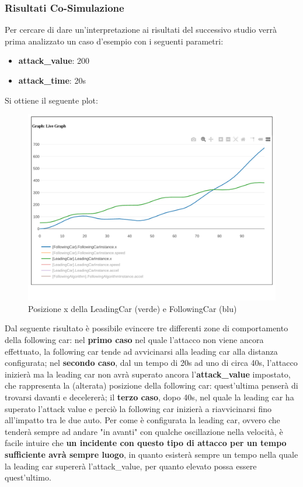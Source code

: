 \subsubsection{Risultati Co-Simulazione}
Per cercare di dare un'interpretazione ai risultati del successivo studio verrà prima analizzato un caso d'esempio con i seguenti parametri:
\begin{itemize}
	\item \textbf{attack\_value}: 200
	\item \textbf{attack\_time}: 20s
\end{itemize}

Si ottiene il seguente plot:
\begin{figure}[H]
	\centering
	\includegraphics[width=\textwidth]{img/AttackXSimulation.png}
	\caption{Posizione x della LeadingCar (verde) e FollowingCar (blu)}
\end{figure}
Dal seguente risultato è possibile evincere tre differenti zone di comportamento della following car: nel \textbf{primo caso} nel quale l'attacco non viene ancora effettuato, la following car tende ad avvicinarsi alla leading car alla distanza configurata; nel \textbf{secondo caso}, dal un tempo di 20s ad uno di circa 40s, l'attacco inizierà ma la leading car non avrà superato ancora l'\textbf{attack\_value} impostato, che rappresenta la (alterata) posizione della following car: quest'ultima penserà di trovarsi davanti e decelererà; il \textbf{terzo caso}, dopo 40s, nel quale la leading car ha superato l'attack value e perciò la following car inizierà a riavvicinarsi fino all'impatto tra le due auto.
Per come è configurata la leading car, ovvero che tenderà sempre ad andare "in avanti" con qualche oscillazione nella velocità, è facile intuire che \textbf{un incidente con questo tipo di attacco per un tempo sufficiente avrà sempre luogo}, in quanto esisterà sempre un tempo nella quale la leading car supererà l'attack\_value, per quanto elevato possa essere quest'ultimo.  
